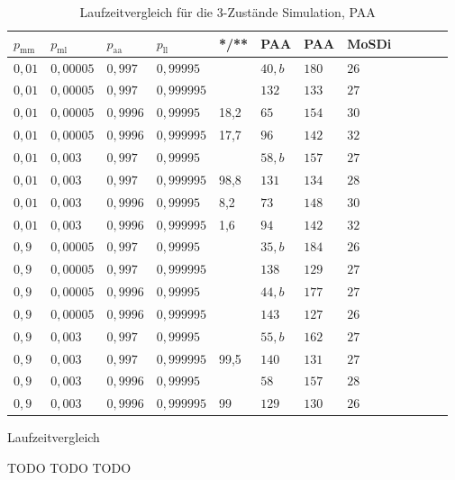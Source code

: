 \begin{table}[h]
\centering 
\caption{Laufzeitvergleich für die 3-Zustände Simulation, PAA}
\label{3s_laufzeit_paa}
\begin{tabular}{|l|l|l|l|l|l|l|l|l|l|l|l|}
\hline
$p_\text{mm}$ & $p_\text{ml}$ & $p_\text{aa}$ & $p_\text{ll}$ &*/**& PAA & PAA & MoSDi \\ \hline \hline
$ 0,01 $ & $0,00005$ & $0,997$  & $0,99995$  &&  $40, b $ & $180  $ & $26 $  \\ \hline
$ 0,01 $ & $0,00005$ & $0,997$  & $0,999995$ &&  $132  $ & $133  $ & $27 $  \\ \hline
$ 0,01 $ & $0,00005$ & $0,9996$ & $0,99995$  &18,2& $65 $ & $154  $ & $30 $  \\ \hline
$ 0,01 $ & $0,00005$ & $0,9996$ & $0,999995$ &17,7& $96 $ & $142  $ & $ 32 $  \\ \hline
$ 0,01 $ & $0,003 $  & $0,997$  & $0,99995$  &&  $58, b  $ & $157  $ & $27 $  \\ \hline
$ 0,01 $ & $0,003 $  & $0,997$  & $0,999995$ &98,8&$131  $ & $134  $ & $ 28 $  \\ \hline
$ 0,01 $ & $0,003 $  & $0,9996$ & $0,99995$  &8,2& $73  $ & $148  $ & $ 30  $  \\ \hline
$ 0,01 $ & $0,003 $  & $0,9996$ & $0,999995$ &1,6& $94  $ & $142  $ & $32 $  \\ \hline
$ 0,9  $ & $0,00005$ & $0,997$  & $0,99995$  &&  $35, b $ & $184 $   & $26 $  \\ \hline
$ 0,9  $ & $0,00005$ & $0,997$  & $0,999995$ &&  $138   $ & $129 $   & $27 $  \\ \hline
$ 0,9  $ & $0,00005$ & $0,9996$ & $0,99995$  &&  $44, b $ & $177 $   & $27 $  \\ \hline
$ 0,9  $ & $0,00005$ & $0,9996$ & $0,999995$ &&  $143   $ & $127 $  & $26 $  \\ \hline
$ 0,9  $ & $0,003 $  & $0,997$  & $0,99995$  &&  $55, b $ & $162 $   & $ 27$  \\ \hline
$ 0,9  $ & $0,003 $  & $0,997$  & $0,999995$ &99,5&$140  $ & $131   $ & $27 $  \\ \hline
$ 0,9  $ & $0,003 $  & $0,9996$ & $0,99995$  &&  $58   $ & $157 $   & $28 $  \\ \hline
$ 0,9  $ & $0,003 $  & $0,9996$ & $0,999995$ &99& $129 $ & $130 $ & $26 $  \\ \hline
\end{tabular}
\end{table}


Laufzeitvergleich


TODO TODO TODO


